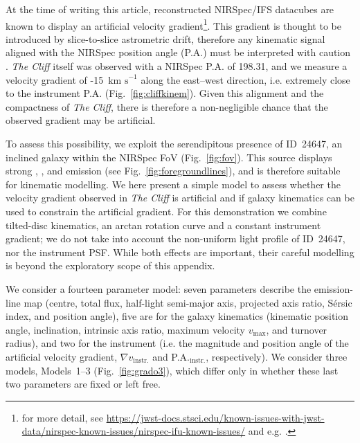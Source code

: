 \documentclass[fleqn,usenatbib]{mnras}
\newcommand{\Halpha}{\text{H\textalpha}\xspace}
\newcommand{\Hbeta}{\text{H\textbeta}\xspace}
\newcommand{\kms}{\ensuremath{\text{km s}^{-1}}\xspace}
\newcommand{\OIIIall}{\forbiddenEL[O][iii][\textlambda][\textlambda][4959,][5007]}
\newcommand{\NIIall}{\forbiddenEL[N][ii][\textlambda][\textlambda][6548,][6583]}
\newcommand{\cliff}{\textit{The Cliff}\xspace}
\newcommand{\neigh}{ID~24647\xspace}
\begin{document}
At the time of writing this article, reconstructed NIRSpec/IFS datacubes are known to display an artificial velocity gradient\footnote{for more detail, see \hyperlink{https://jwst-docs.stsci.edu/known-issues-with-jwst-data/nirspec-known-issues/nirspec-ifu-known-issues/}{https://jwst-docs.stsci.edu/known-issues-with-jwst-data/nirspec-known-issues/nirspec-ifu-known-issues/} and e.g. \citealt{Pascalau2026_gradient}.}. This gradient is thought to be introduced by slice-to-slice astrometric drift, therefore any kinematic signal aligned with the NIRSpec position angle (P.A.) must be interpreted with caution \citep[as discussed in e.g.,][]{Juodzbalis2025_QSO1}.
\cliff itself was observed with a NIRSpec P.A. of 198.31\textdegree, and we measure a velocity gradient of -15~\kms along the east--west direction, i.e. extremely close to the instrument P.A. (Fig.~\ref{fig:cliffkinem}).
Given this alignment and the compactness of \cliff, there is therefore a non-negligible chance that the observed gradient may be artificial.

To assess this possibility, we exploit the serendipitous presence of \neigh, an inclined galaxy within the NIRSpec FoV (Fig.~\ref{fig:fov}).
This source displays strong \Hbeta, \OIIIall, \Halpha and \NIIall emission (see Fig.~\ref{fig:foregroundlines}), and is therefore suitable for kinematic modelling.
We here present a simple model to assess whether the velocity gradient observed in \cliff is artificial and if galaxy kinematics can be used to constrain the artificial gradient. For this demonstration we combine tilted-disc kinematics, an arctan rotation curve and a constant instrument gradient; we do not take into account the non-uniform light profile of \neigh, nor the instrument PSF. While both effects are important, their careful modelling is beyond the exploratory scope of this appendix.

We consider a fourteen parameter model: seven parameters describe the emission-line map (centre, total flux, half-light semi-major axis, projected axis ratio, S\'ersic index, and position angle), five are for the galaxy kinematics
(kinematic position angle, inclination, intrinsic axis ratio, maximum velocity $v_\mathrm{max}$, and turnover radius), and two for the instrument (i.e. the magnitude and position angle of the artificial velocity gradient, $\nabla v_\mathrm{instr.}$ and P.A.$_\mathrm{instr.}$, respectively). We consider three models, Models~1--3 (Fig.~\ref{fig:grado3}), which differ only in whether these last two parameters are fixed or left free.
\end{document}
